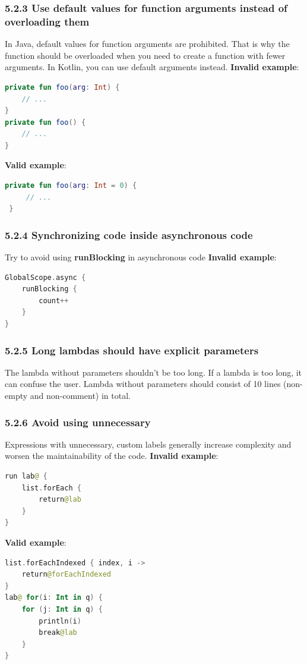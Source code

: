\subsubsection*{\textbf{5.2.3 Use default values for function arguments instead of overloading them}}
\leavevmode\newline
\label{sec:5.2.3}
In Java, default values for function arguments are prohibited. That is why the function should be overloaded when you need to create a function with fewer arguments.
In Kotlin, you can use default arguments instead.
\textbf{Invalid example}:
\begin{lstlisting}[language=Kotlin]
private fun foo(arg: Int) {
    // ...
}
private fun foo() {
    // ...
}
\end{lstlisting}
\textbf{Valid example}:
\begin{lstlisting}[language=Kotlin]
 private fun foo(arg: Int = 0) {
     // ...
 }
\end{lstlisting}
\subsubsection*{\textbf{5.2.4 Synchronizing code inside asynchronous code}}
\leavevmode\newline
\label{sec:5.2.4}
Try to avoid using \textbf{runBlocking} in asynchronous code
\textbf{Invalid example}:
\begin{lstlisting}[language=Kotlin]
GlobalScope.async {
    runBlocking {
        count++
    }   
}
\end{lstlisting}
\subsubsection*{\textbf{5.2.5 Long lambdas should have explicit parameters}}
\leavevmode\newline
\label{sec:5.2.5}
The lambda without parameters shouldn't be too long.
If a lambda is too long, it can confuse the user. Lambda without parameters should consist of 10 lines (non-empty and non-comment) in total.
\subsubsection*{\textbf{5.2.6 Avoid using unnecessary}}
\leavevmode\newline
\label{sec:5.2.6}
Expressions with unnecessary, custom labels generally increase complexity and worsen the maintainability of the code.
\textbf{Invalid example}:
\begin{lstlisting}[language=Kotlin]
run lab@ {
    list.forEach {
        return@lab
    }
}
\end{lstlisting}
\textbf{Valid example}:
\begin{lstlisting}[language=Kotlin]
list.forEachIndexed { index, i ->
    return@forEachIndexed
}
lab@ for(i: Int in q) {
    for (j: Int in q) {
        println(i)
        break@lab
    }
}
\end{lstlisting}
